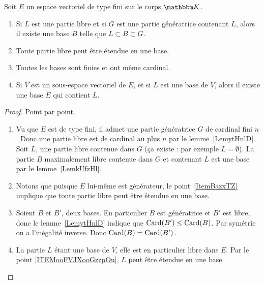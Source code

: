 \begin{theorem} \label{ThonmnWKs}
    Soit \( E\) un espace vectoriel de type fini sur le corps \( \eK\).
    \begin{enumerate}
        \item     \label{ItemBazxTZ}
            Si \( L\) est une partie libre et si \( G\) est une partie génératrice contenant \( L\), alors il existe une base \( B\) telle que \( L\subset B\subset G\).
        \item     \label{ITEMooFVJXooGzzpOu}
            Toute partie libre peut être étendue en une base.
        \item     \label{ITEMooFBUAooSSZxgx}
            Toutes les bases sont finies et ont même cardinal.
        \item       \label{ITEMooJIJSooGuJMdt}
            Si \( V\) est un sous-espace vectoriel de \( E\), et si \( L\) est une base de \( V\), alors il existe une base \( E\) qui contient \( L\).
    \end{enumerate}
\end{theorem}

\begin{proof}
    Point par point.
    \begin{enumerate}
        \item
    Vu que \( E\) est de type fini, il admet une partie génératrice \( G\) de cardinal fini \( n\). Donc une partie libre est de cardinal au plus \( n\) par le lemme~\ref{LemytHnlD}. Soit \( L\), une partie libre contenue dans \( G\) (ça existe : par exemple \( L=\emptyset\)). La partie \( B\) maximalement libre contenue dans \( G\) et contenant \( L\) est une base par le lemme~\ref{LemkUfzHl}.
\item
Notons que puisque \( E\) lui-même est générateur, le point~\ref{ItemBazxTZ} implique que toute partie libre peut être étendue en une base.
\item
    Soient \( B\) et \( B'\), deux bases. En particulier \( B\) est génératrice et \( B'\) est libre, donc le lemme~\ref{LemytHnlD} indique que \( \operatorname{Card}(B')\leq \operatorname{Card}(B)\). Par symétrie on a l'inégalité inverse. Donc \( \operatorname{Card}(B)=\operatorname{Card}(B')\).
\item
    La partie \( L\) étant une base de \( V\), elle est en particulier libre dans \( E\). Par le point \ref{ITEMooFVJXooGzzpOu}, \( L\) peut être étendue en une base.
    \end{enumerate}
\end{proof}


